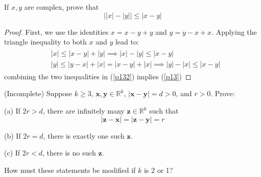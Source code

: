 \documentclass[12pt]{article}
\newenvironment{problem}[2][Problem]{\begin{trivlist}
\item[\hskip \labelsep {\bfseries #1}\hskip \labelsep {\bfseries #2.}]}{\end{trivlist}}
\begin{document}
\begin{problem}{9}

\end{problem}
\begin{problem}{10}

\end{problem}
\begin{problem}{11}

\end{problem}
\begin{problem}{12}

\end{problem}
\begin{problem}{13}
If $x,y$ are complex, prove that
\begin{equation}\label{p13}
\bigl||x| - |y|\bigr| \leq |x - y|
\end{equation}
\begin{proof}
First, we use the identities $x = x - y + y$ and $y = y - x + x$.  Applying the triangle inequality to both $x$ and $y$ lead to:
\begin{align}\label{p132}
\begin{split}
&|x| \leq |x - y| + |y| \implies |x| - |y| \leq |x-y| \\
&|y| \leq |y - x| + |x| = |x - y| + |x| \implies |y| - |x| \leq |x-y|
\end{split}
\end{align}
combining the two inequalities in (\ref{p132}) implies (\ref{p13})
\end{proof}
\end{problem}
\begin{problem}{14}

\end{problem}
\begin{problem}{15}

\end{problem}
\begin{problem}{16}
(Incomplete) Suppose $k \geq 3$, $\mathbf{x},\mathbf{y} \in \mathbb{R}^k$, $|\mathbf{x}-\mathbf{y}| = d > 0$, and $r > 0$.  Prove:

(a) If $2r > d$, there are infinitely many $\mathbf{z}\in \mathbb{R}^k$ such that
\begin{equation}\label{16_hypothesis}
|\mathbf{z} - \mathbf{x}| = |\mathbf{z} - \mathbf{y}| = r
\end{equation}

(b) If $2r = d$, there is exactly one such $\mathbf{z}$.

(c) If $2r < d$, there is no such $\mathbf{z}$.

How must these statements be modified if $k$ is 2 or 1?
\end{problem}
\end{document}
